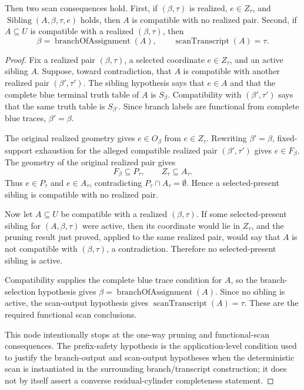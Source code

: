 \begin{helper}
Then two scan consequences hold.  First, if \((\beta,\tau)\) is realized,
\(e\in Z_\tau\), and \(\operatorname{Sibling}(A,\beta,\tau,e)\) holds, then
\(A\) is compatible with no realized pair.  Second, if \(A\subseteq U\) is
compatible with a realized \((\beta,\tau)\), then
\[
\beta=\operatorname{branchOfAssignment}(A),
\qquad
\operatorname{scanTranscript}(A)=\tau .
\]
\end{helper}
\begin{proof}
Fix a realized pair \((\beta,\tau)\), a selected coordinate \(e\in Z_\tau\),
and an active sibling \(A\).  Suppose, toward contradiction, that \(A\) is
compatible with another realized pair \((\beta',\tau')\).  The sibling
hypothesis says that \(e\in A\) and that the complete blue terminal truth
table of \(A\) is \(S_\beta\).  Compatibility with
\((\beta',\tau')\) says that the same truth table is \(S_{\beta'}\).  Since
branch labels are functional from complete blue traces, \(\beta'=\beta\).

The original realized geometry gives \(e\in O_\beta\) from
\(e\in Z_\tau\).  Rewriting \(\beta'=\beta\), fixed-support exhaustion for
the alleged compatible realized pair \((\beta',\tau')\) gives
\(e\in F_\beta\).  The geometry of the original realized pair gives
\[
F_\beta\subseteq P_\tau,\qquad Z_\tau\subseteq A_\tau .
\]
Thus \(e\in P_\tau\) and \(e\in A_\tau\), contradicting
\(P_\tau\cap A_\tau=\emptyset\).  Hence a selected-present sibling is
compatible with no realized pair.

Now let \(A\subseteq U\) be compatible with a realized \((\beta,\tau)\).  If
some selected-present sibling for \((A,\beta,\tau)\) were active, then its
coordinate would lie in \(Z_\tau\), and the pruning result just proved,
applied to the same realized pair, would say that \(A\) is not compatible
with \((\beta,\tau)\), a contradiction.  Therefore no selected-present
sibling is active.

Compatibility supplies the complete blue trace condition for \(A\), so the
branch-selection hypothesis gives
\(\beta=\operatorname{branchOfAssignment}(A)\).  Since no sibling is active,
the scan-output hypothesis gives
\(\operatorname{scanTranscript}(A)=\tau\).  These are the required
functional scan conclusions.

This node intentionally stops at the one-way pruning and functional-scan
consequences.  The prefix-safety hypothesis is the application-level
condition used to justify the branch-output and scan-output hypotheses when
the deterministic scan is instantiated in the surrounding
branch/transcript construction; it does not by itself assert a converse
residual-cylinder completeness statement.
\end{proof}
